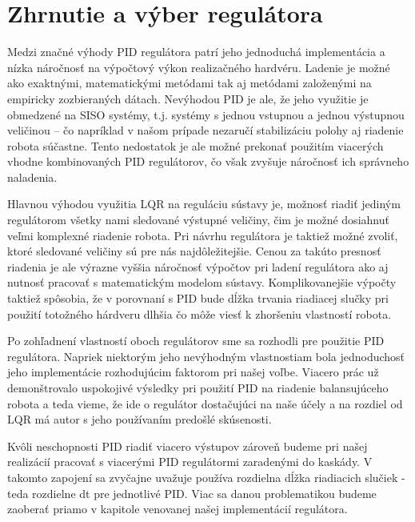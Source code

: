 \section{Zhrnutie a výber regulátora}
Medzi značné výhody PID regulátora patrí jeho jednoduchá implementácia a nízka náročnosť na výpočtový výkon realizačného hardvéru. Ladenie je možné ako exaktnými, matematickými metódami tak aj metódami založenými na empiricky zozbieraných dátach. Nevýhodou PID je ale,  že jeho využitie je obmedzené na SISO systémy, t.j. systémy s jednou vstupnou a jednou výstupnou veličinou – čo napríklad v našom prípade nezaručí stabilizáciu polohy aj riadenie robota súčastne. Tento nedostatok je ale možné prekonať použitím viacerých vhodne kombinovaných PID regulátorov, čo však zvyšuje náročnosť ich správneho naladenia.

Hlavnou výhodou využitia LQR na reguláciu sústavy je, možnosť riadiť jediným regulátorom všetky nami sledované výstupné veličiny, čim je možné dosiahnuť veľmi komplexné riadenie robota. Pri návrhu regulátora je taktiež možné zvoliť, ktoré sledované veličiny sú pre nás najdôležitejšie. Cenou za takúto presnosť riadenia je ale výrazne vyššia náročnosť výpočtov pri ladení regulátora ako aj nutnosť pracovať s matematickým modelom sústavy. Komplikovanejšie výpočty taktiež spôsobia, že v porovnaní s PID bude dĺžka trvania riadiacej slučky pri použití totožného hárdveru dlhšia čo môže viesť k zhoršeniu vlastností robota.

Po zohľadnení vlastností oboch regulátorov sme sa rozhodli pre použitie PID regulátora. Napriek niektorým jeho nevýhodným vlastnostiam bola jednoduchosť jeho implementácie rozhodujúcim faktorom pri našej voľbe. Viacero prác už demonštrovalo uspokojivé výsledky pri použití PID na riadenie balansujúceho robota a teda vieme, že ide o regulátor dostačujúci na naše účely a na rozdiel od LQR má autor s jeho používaním predošlé skúsenosti. 

Kvôli neschopnosti PID riadiť viacero výstupov zároveň budeme pri našej realizácií pracovať s viacerými PID regulátormi zaradenými do kaskády. V takomto zapojení sa zvyčajne uvažuje používa rozdielna dĺžka riadiacich slučiek - teda  rozdielne dt pre jednotlivé PID. Viac sa danou problematikou budeme zaoberať priamo v kapitole venovanej našej implementácií regulátora.